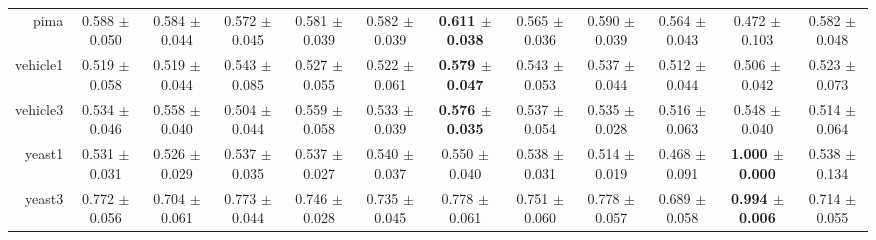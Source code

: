 \begin{table}[!ht]
{\begin{tabular}{r c c c c c c c c c c c}
pima & 0.588 $\pm$ 0.050 & 0.584 $\pm$ 0.044 & 0.572 $\pm$ 0.045 & 0.581 $\pm$ 0.039 & 0.582 $\pm$ 0.039 & \textbf{0.611 $\pm$ 0.038} & 0.565 $\pm$ 0.036 & 0.590 $\pm$ 0.039 & 0.564 $\pm$ 0.043 & 0.472 $\pm$ 0.103 & 0.582 $\pm$ 0.048 \\
vehicle1 & 0.519 $\pm$ 0.058 & 0.519 $\pm$ 0.044 & 0.543 $\pm$ 0.085 & 0.527 $\pm$ 0.055 & 0.522 $\pm$ 0.061 & \textbf{0.579 $\pm$ 0.047} & 0.543 $\pm$ 0.053 & 0.537 $\pm$ 0.044 & 0.512 $\pm$ 0.044 & 0.506 $\pm$ 0.042 & 0.523 $\pm$ 0.073 \\
vehicle3 & 0.534 $\pm$ 0.046 & 0.558 $\pm$ 0.040 & 0.504 $\pm$ 0.044 & 0.559 $\pm$ 0.058 & 0.533 $\pm$ 0.039 & \textbf{0.576 $\pm$ 0.035} & 0.537 $\pm$ 0.054 & 0.535 $\pm$ 0.028 & 0.516 $\pm$ 0.063 & 0.548 $\pm$ 0.040 & 0.514 $\pm$ 0.064 \\
yeast1 & 0.531 $\pm$ 0.031 & 0.526 $\pm$ 0.029 & 0.537 $\pm$ 0.035 & 0.537 $\pm$ 0.027 & 0.540 $\pm$ 0.037 & 0.550 $\pm$ 0.040 & 0.538 $\pm$ 0.031 & 0.514 $\pm$ 0.019 & 0.468 $\pm$ 0.091 & \textbf{1.000 $\pm$ 0.000} & 0.538 $\pm$ 0.134 \\
yeast3 & 0.772 $\pm$ 0.056 & 0.704 $\pm$ 0.061 & 0.773 $\pm$ 0.044 & 0.746 $\pm$ 0.028 & 0.735 $\pm$ 0.045 & 0.778 $\pm$ 0.061 & 0.751 $\pm$ 0.060 & 0.778 $\pm$ 0.057 & 0.689 $\pm$ 0.058 & \textbf{0.994 $\pm$ 0.006} & 0.714 $\pm$ 0.055 \\
\end{tabular}}
\end{table}
